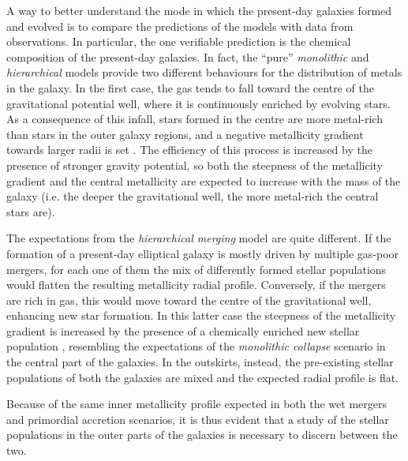 	A way to better understand the mode in which the present-day galaxies formed and evolved is to compare the 
	predictions of the models with data from observations. 
	In particular, the one verifiable prediction is the chemical composition of the present-day galaxies. 
	In fact, the ``pure'' \textit{monolithic} and \textit{hierarchical} models provide two different behaviours for the 
	distribution of metals in the galaxy.
	In the first case, the gas tends to fall toward the centre of the gravitational potential well, where it is continuously 
	enriched by evolving stars. 
	As a consequence of this infall, stars formed in the centre are more metal-rich than stars in the outer galaxy 
	regions, and a negative metallicity gradient towards larger radii is set \citep{Chiosi02}. 
	The efficiency of this process is increased by the presence of stronger gravity potential, so both the steepness 
	of the metallicity gradient and the central metallicity \citep{Spolaor10b} are expected to increase 
	with the mass of 	the galaxy (i.e. the deeper the gravitational well, the more metal-rich the central stars are). 
	
	The expectations from the \textit{hierarchical merging} model are quite different. 
	If the formation of a present-day elliptical galaxy is mostly driven by multiple gas-poor mergers, for each one of them 
	the mix of differently formed stellar populations would flatten the resulting metallicity radial profile. 
	Conversely, if the mergers are rich in gas, this would move toward the centre of the gravitational well, enhancing 
	new star formation. 
	In this latter case the steepness of the metallicity gradient is increased by the presence of a chemically enriched new 
	stellar population \citep{Pipino08}, resembling the expectations of the 
	\textit{monolithic collapse} scenario in the central part of the galaxies.  
	In the outskirts, instead, the pre-existing stellar populations of both the galaxies are mixed and the 
	expected radial profile is flat.
	
	Because of the same inner metallicity profile expected in both the wet mergers and primordial accretion scenarios, it 
	is thus 	evident that a study of the stellar populations in the outer parts of the galaxies is necessary to discern between 
	the two. 
	
